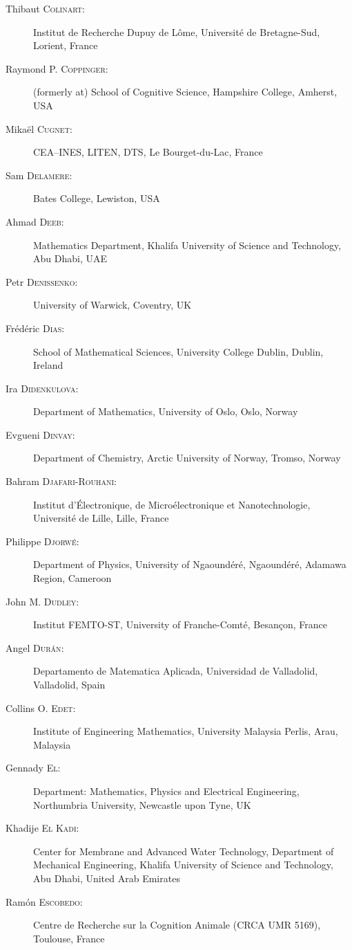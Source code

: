 \documentclass[final, a4paper, oneside, 12pt]{article}
\numberwithin{equation}{section}
\begin{document}
\begin{description}
  \item[Thibaut \textsc{Colinart}:] Institut de Recherche Dupuy de L\^ome, Universit\'e de Bretagne-Sud, Lorient, France
  \item[Raymond P. \textsc{Coppinger}:] (formerly at) School of Cognitive Science, Hampshire College, Amherst, USA
  \item[Mika\"el \textsc{Cugnet}:] CEA--INES, LITEN, DTS, Le Bourget-du-Lac, France
  \item[Sam \textsc{Delamere}:] Bates College, Lewiston, USA
  \item[Ahmad \textsc{Deeb}:] Mathematics Department, Khalifa University of Science and Technology, Abu Dhabi, UAE
  \item[Petr \textsc{Denissenko}:] University of Warwick, Coventry, UK
  \item[Fr\'ed\'eric \textsc{Dias}:] School of Mathematical Sciences, University College Dublin, Dublin, Ireland
  \item[Ira \textsc{Didenkulova}:] Department of Mathematics, University of Oslo, Oslo, Norway
  \item[Evgueni \textsc{Dinvay}:] Department of Chemistry, Arctic University of Norway, Tromso, Norway
  \item[Bahram \textsc{Djafari-Rouhani}:] Institut d'\'Electronique, de Micro\'electronique et Nanotechnologie, Universit\'e de Lille, Lille, France
  \item[Philippe \textsc{Djorw\'e}:] Department of Physics, University of Ngaound\'er\'e, Ngaoundéré, Adamawa Region, Cameroon
  \item[John M. \textsc{Dudley}:] Institut FEMTO-ST, University of Franche-Comt\'e, Besan\c{c}on, France
  \item[Angel \textsc{Dur\'an}:] Departamento de Matematica Aplicada, Universidad de Valladolid, Valladolid, Spain
  \item[Collins O. \textsc{Edet}:] Institute of Engineering Mathematics, University Malaysia Perlis, Arau, Malaysia
  \item[Gennady \textsc{El}:] Department: Mathematics, Physics and Electrical Engineering, Northumbria University, Newcastle upon Tyne, UK
  \item[Khadije \textsc{El Kadi}:] Center for Membrane and Advanced Water Technology, Department of Mechanical Engineering, Khalifa University of Science and Technology, Abu Dhabi, United Arab Emirates
  \item[Ram\'on \textsc{Escobedo}:] Centre de Recherche sur la Cognition Animale (CRCA UMR 5169), Toulouse, France

\end{description}
\end{document}
